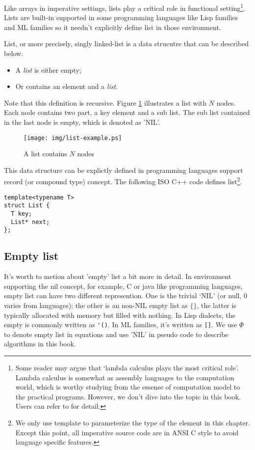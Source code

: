 \documentclass{article}
\begin{document}
Like arrays in imperative settings, lists play a critical role in functional setting\footnote{Some 
reader may argue that `lambda calculus plays the most critical role'.
Lambda calculus is somewhat as assembly languages to the computation world, which 
is worthy studying from the essense of computation model to the practical programs.
However, we don't dive into the topic in this book. Users can refer to \cite{mittype}
for detail.}. Lists are built-in supported in some programming languages like Lisp
families and ML families so it needn't explicitly define list in those environment.

List, or more precisely, singly linked-list is a data strucutre that can be described
below.

\begin{itemize}
\item A {\em list} is either empty;
\item Or contains an element and a {\em list}.
\end{itemize}

Note that this definition is recursive. Figure \ref{fig:list-example} illustrates
a list with $N$ nodes. Each node contains two part, a key element and a sub list. The
sub list contained in the last node is empty, which is denoted as 'NIL'.

\begin{figure}[htbp]
        \centering
        \texttt{[image: img/list-example.ps]}
        \caption{A list contains $N$ nodes} \label{fig:list-example}
\end{figure}

This data structure can be explictly defined in programming languages support record
(or compound type) concept. The following ISO C++ code defines list\footnote{We only use
template to parameterize the type of the element in this chapter. Except this point,
all imperative source code are in ANSI C style to avoid language specific features.}.

\lstset{language=C++}
\begin{lstlisting}
template<typename T>
struct List {
  T key;
  List* next;
};
\end{lstlisting}

\subsection{Empty list}
It's worth to metion about 'empty' list a bit more in detail. In environment supporting the
nil concept, for example, C or java like programming languages, empty list can have two
different represention. One is the trivial `NIL' (or null, 0 varies from languages);
the other is an non-NIL empty list as $\{ \}$, the latter is typically allocated with
memory but filled with nothing. In Lisp dialects, the empty is commonly written as \verb|'()|.
In ML families, it's written as \verb|[]|. We use $\Phi$ to denote empty list in equations
and use 'NIL' in pseudo code to describe algorithms in this book.
\end{document}
